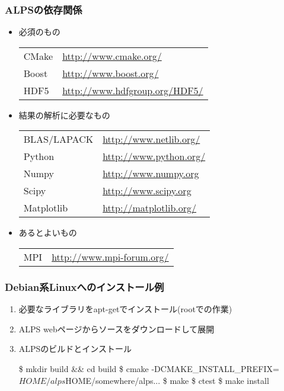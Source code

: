 \begin{frame}
  \frametitle{ALPSの依存関係}
  \begin{itemize}
  \item 必須のもの\\
    \begin{tabular}{ll}
      CMake & \url{http://www.cmake.org/} \\
      Boost & \url{http://www.boost.org/} \\
      HDF5  & \url{http://www.hdfgroup.org/HDF5/} \\
    \end{tabular}
  \item 結果の解析に必要なもの \\
    \begin{tabular}{ll}
      BLAS/LAPACK & \url{http://www.netlib.org/} \\
      Python & \url{http://www.python.org/} \\
      Numpy & \url{http://www.numpy.org} \\
      Scipy & \url{http://www.scipy.org} \\
      Matplotlib & \url{http://matplotlib.org/}
    \end{tabular}
  \item あるとよいもの \\
    \begin{tabular}{ll}
      MPI & \url{http://www.mpi-forum.org/} \\
    \end{tabular}
  \end{itemize}
\end{frame}

\begin{frame}[fragile,shrink=10]
  \frametitle{Debian系Linuxへのインストール例}
  \begin{enumerate}
  \item 必要なライブラリをapt-getでインストール(rootでの作業)
  \item ALPS webページからソースをダウンロードして展開
  \item ALPSのビルドとインストール
\begin{semiverbatim}
\$ mkdir build && cd build
\$ cmake -DCMAKE_INSTALL_PREFIX=${HOME}/alps $HOME/somewhere/alps...
\$ make
\$ ctest
\$ make install
\end{semiverbatim}
  \end{enumerate}
\end{frame}

